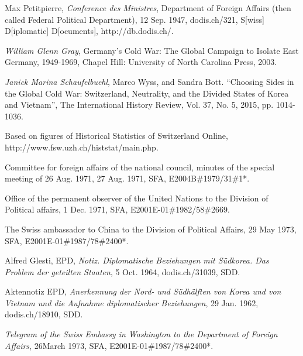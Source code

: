\documentclass[a4paper]{article}
\begin{document}
\begin{thebibliography}{9}
Max Petitpierre, \emph{Conference des Ministres}, Department of Foreign Affairs (then called Federal Political Department), 12 Sep. 1947, dodis.ch/321, S[wiss] D[iplomatic] D[ocuments], http://db.dodis.ch/.

\emph{William Glenn Gray}, Germany’s Cold War: The Global Campaign to Isolate East Germany, 1949-1969, Chapel Hill: University of North Carolina Press, 2003.

\emph{Janick Marina Schaufelbuehl}, Marco Wyss, and Sandra Bott. “Choosing Sides in the Global Cold War: Switzerland, Neutrality, and the Divided States of Korea and Vietnam”, The International History Review, Vol. 37, No. 5, 2015, pp. 1014-1036.

Based on figures of Historical Statistics of Switzerland Online, http://www.fsw.uzh.ch/histstat/main.php.

Committee for foreign affairs of the national council, minutes of the special meeting of 26 Aug. 1971, 27 Aug. 1971, SFA, E2004B\#1979/31\#1*.

Office of the permanent observer of the United Nations to the Division of Political affairs, 1 Dec. 1971, SFA, E2001E-01\#1982/58\#2669.

The Swiss ambassador to China to the Division of Political Affairs, 29 May 1973, SFA, E2001E-01\#1987/78\#2400*.

Alfred Glesti, EPD, \emph{Notiz. Diplomatische Beziehungen mit Südkorea. Das Problem der geteilten Staaten}, 5 Oct. 1964, dodis.ch/31039, SDD.

Aktennotiz EPD, \emph{Anerkennung der Nord- und Südhälften von Korea und von Vietnam und die Aufnahme diplomatischer Beziehungen}, 29 Jan. 1962, dodis.ch/18910, SDD.

\emph{Telegram of the Swiss Embassy in Washington to the Department of Foreign Affairs}, 26March 1973, SFA, E2001E-01\#1987/78\#2400*.




\end{thebibliography}
\end{document}
